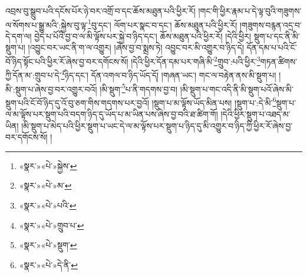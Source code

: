 འབྲས་བུ་སྒྲུབ་པའི་དངོས་པོར་ཉེ་བར་འགྲོ་བ་དང་ཆོས་མཐུན་པའི་ཕྱིར་རོ། །གང་གི་ཕྱིར་རྣམ་པ་དེ་ལྟ་བུའི་གཟུགས་ལ་སོགས་པ་སྒྱུ་མའི་:སྐྱེས་བུ་ལྟ་\footnote{«སྣར་»«པེ་»སྐྱེས་}བུ་དང་། ལོག་པར་སྣང་བ་དང་། ཆོས་མཐུན་པའི་ཕྱིར་རོ། །གཟུགས་བརྙན་འདྲ་བ་དེ་དག་ལ། བྱེད་པ་པོའི་བྱ་བ་ལ་མི་ལྟོས་པར་སྐྱེ་བ་ཉིད་དང་། ཆོས་མཐུན་པའི་ཕྱིར་རོ། །དེའི་ཕྱིར། སྡུག་པ་དང་ནི་མི་སྡུག་པ། །འབྱུང་བར་ཡང་ནི་ག་ལ་འགྱུར། །ཞེས་བྱ་བ་སྨྲས་ཏེ། འབྱུང་བར་མི་འགྱུར་བ་ཉིད་དེ། དོན་དམ་པ་པའི་ངོ་བོ་ཉིད་སྟོང་པའི་ཕྱིར་རོ་ཞེས་བྱ་བར་དགོངས་སོ། །དེའི་ཕྱིར་དོན་དམ་པར་གཞི་མི་\footnote{«སྣར་»«པེ་»མ་}གྲུབ་:པའི་ཕྱིར་\footnote{«སྣར་»«པེ་»པའི་}གཏན་ཚིགས་ཀྱི་དོན་མ་:གྲུབ་པ་དེ་\footnote{«སྣར་»«པེ་»གྲུབ་པ་}ཉིད་དང་། དོན་འགལ་བ་ཉིད་ཡོད་དོ། །གཞན་ཡང་། གང་ལ་བརྟེན་ནས་མི་སྡུག་པ། །མི་:སྡུག་པ་ཞེས་བྱ་བར་འགྱུར་བའོ། །མི་སྡུག་\footnote{«སྣར་»«པེ་»སྡུག་}པ་ནི་གདགས་བྱ་བ། །མི་སྡུག་པ་གང་འདི་ནི་མི་སྡུག་པའོ་ཞེས་མི་སྡུག་པའི་ངོ་བོ་ཉིད་དུ་འོ་བུ་ཅག་གིས་གདགས་པར་བྱའོ། །སྡུག་པ་མ་ལྟོས་ཡོད་མིན་པས། །སྡུག་པ་:དེ་མི་\footnote{«སྣར་»«པེ་»དེ་ནི་}སྡུག་པ་ལ་མ་ལྟོས་པར་སྡུག་པའི་བདག་ཉིད་དུ་ཡོད་པ་མ་ཡིན་པས་ཞེས་བྱ་བའི་ཐ་ཚིག་གོ། །དེའི་ཕྱིར་སྡུག་པ་འཐད་མ་ཡིན། །མི་སྡུག་པ་མེད་པའི་ཕྱིར་སྡུག་པ་ཡང་དེ་ལ་མ་ལྟོས་པར་སྡུག་པ་ཉིད་དུ་མི་འགྱུར་བ་ཉིད་ཀྱི་ཕྱིར་རོ་ཞེས་བྱ་བར་དགོངས་སོ། །
